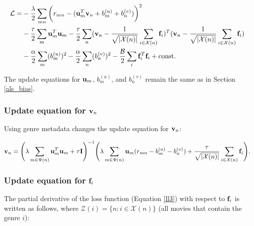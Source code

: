 \documentclass{article}
\begin{document}
\begin{equation} \label{ll3}
    \begin{split}
    \mathcal{L}= & -\dfrac{\lambda}{2} \sum\limits_{mn} \bigg(r_{mn} - (\vb{u}_{m}^{T} \vb{v}_{n} + b_{m}^{(u)} + b_{n}^{(v)})\bigg)^{2} \\
                 & -\dfrac{\tau}{2} \sum\limits_{m} \vb{u}_{m}^{T} \vb{u}_{m} - \dfrac{\tau}{2} \sum\limits_{n} (\vb{v}_{n} - \dfrac{1}{\sqrt{|\mathcal{X}(n)|}}\sum\limits_{i \in \mathcal{X}(n)}\vb{f}_i)^{T} (\vb{v}_{n} - \dfrac{1}{\sqrt{|\mathcal{X}(n)|}}\sum\limits_{i \in \mathcal{X}(n)}\vb{f}_i) \\
                 & -\dfrac{\alpha}{2} \sum\limits_{m} (b_{m}^{(u)})^{2} - \dfrac{\alpha}{2} \sum\limits_{n} (b_{n}^{(v)})^{2} -\dfrac{\mathcal{B}}{2} \sum\limits_{i} \vb{f}_{i}^{T} \vb{f}_{i} + \text{const}\text{.}
    \end{split}
\end{equation}

The update equations for $\vb{u}_m$, $b_{m}^{(u)}$, and $b_{n}^{(v)}$ remain the same as in Section \ref{als_bias}.

\subsubsection{Update equation for $\vb{v}_{n}$}
Using genre metadata changes the update equation for $\vb{v}_{n}$:

\begin{equation}
    \begin{split}
        \vb{v}_n = \Bigg(\lambda \sum\limits_{m \in \Psi(n)} \vb{u}_{m}^{T}\vb{u}_{m} + \tau \vb{I} \Bigg)^{-1}
        \Bigg(\lambda \sum\limits_{m \in \Psi(n)} \vb{u}_{m}(r_{mn} - b_{m}^{(u)} - b_{n}^{(v)}) + \dfrac{\tau}{\sqrt{|\mathcal{X}(n)|}} \sum\limits_{i \in \mathcal{X}(n)} \vb{f}_i\Bigg)\text{.}
    \end{split}
\end{equation}

\subsubsection{Update equation for $\vb{f}_i$}

The partial derivative of the loss function (Equation \ref{ll3}) with respect to $\vb{f}_i$ is written as follows,
where $\mathcal{Z}(i) = {\{n: i \in \mathcal{X}(n)\}}$ (all movies that contain the genre $i$):
\end{document}
